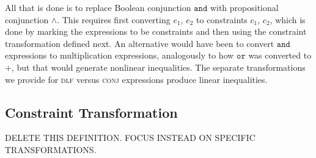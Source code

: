 \documentclass[preprint]{sigplanconf}%
\theoremstyle{remark}
\begin{document}
All that is done is to replace Boolean conjunction $\mathtt{and}$ with
propositional conjunction $\wedge$. This requires first converting $e_{1}$,
$e_{2}$ to constraints $c_{1}$, $c_{2}$, which is done by marking the
expressions to be constraints and then using the constraint transformation
defined next. An alternative would have been to convert $\mathtt{and}$
expressions to multiplication expressions, analogously to how $\mathtt{or}$
was converted to $+$, but that would generate nonlinear inequalities. The
separate transformations we provide for \textsc{dlf} versus \textsc{conj}
expressions produce linear inequalities.

\subsection{Constraint Transformation}

DELETE THIS DEFINITION. FOCUS INSTEAD ON SPECIFIC TRANSFORMATIONS.
\end{document}
